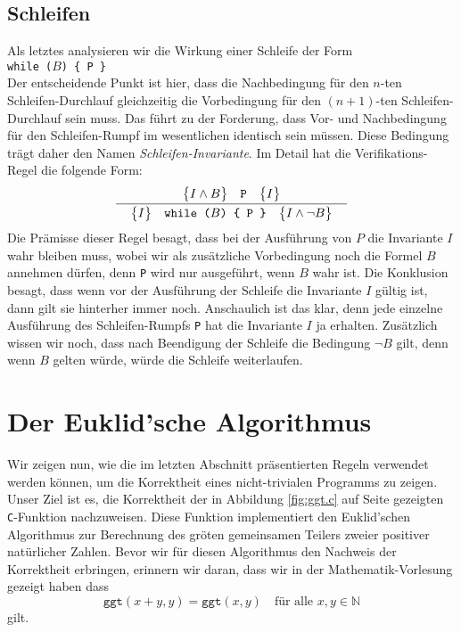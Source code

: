 \subsection{Schleifen}
Als letztes analysieren wir die Wirkung einer Schleife der Form 
\\[0.2cm]
\hspace*{1.3cm}
\texttt{while ($B$) \{ P \}} 
\\[0.2cm]
Der entscheidende Punkt ist hier, dass die Nachbedingung f\"ur den $n$-ten
Schleifen-Durchlauf gleichzeitig die Vorbedingung f\"ur den $(n\!+\!1)$-ten Schleifen-Durchlauf
sein muss.  Das f\"uhrt zu der Forderung, dass Vor- und Nachbedingung f\"ur den
Schleifen-Rumpf im wesentlichen identisch sein m\"ussen.  Diese Bedingung tr\"agt daher den
Namen \emph{Schleifen-Invariante}.  Im Detail hat die Verifikations-Regel die folgende Form:
\[ 
  \bruch{\hoare{I \wedge B}{P}{I}}{\quad \hoare{I}{while ($B$) \{ P \}}{I \wedge \neg B}\quad}
\]
Die Pr\"amisse dieser Regel besagt, dass bei der Ausf\"uhrung von $P$ die Invariante $I$
wahr bleiben muss, wobei wir als zus\"atzliche Vorbedingung noch die Formel $B$ annehmen
d\"urfen, denn \texttt{P} wird  nur ausgef\"uhrt, wenn $B$ wahr ist.
Die Konklusion besagt, dass wenn vor der Ausf\"uhrung der Schleife die Invariante $I$ g\"ultig
ist, dann gilt sie hinterher immer noch.  Anschaulich ist das klar, denn jede einzelne
Ausf\"uhrung des Schleifen-Rumpfs \texttt{P} hat die Invariante $I$ ja erhalten.
Zus\"atzlich wissen wir noch, dass nach Beendigung der Schleife die Bedingung $\neg B$ gilt,
denn wenn $B$ gelten w\"urde, w\"urde die Schleife weiterlaufen.


\section{Der Euklid'sche Algorithmus}
Wir zeigen nun, wie die im letzten Abschnitt pr\"asentierten Regeln verwendet werden k\"onnen,
um die Korrektheit eines nicht-trivialen Programms zu zeigen.  Unser Ziel ist es, die
Korrektheit der in Abbildung \ref{fig:ggt.c} auf Seite \pageref{fig:ggt.c} gezeigten
\texttt{C}-Funktion nachzuweisen.  Diese Funktion implementiert den Euklid'schen
Algorithmus zur Berechnung des gr\"o\3ten gemeinsamen Teilers zweier positiver nat\"urlicher
Zahlen.  Bevor wir f\"ur diesen Algorithmus den Nachweis der Korrektheit
erbringen, erinnern wir daran, dass wir in der Mathematik-Vorlesung gezeigt haben dass
\[ \texttt{ggt}(x + y, y) = \texttt{ggt}(x,y) \quad \mbox{f\"ur alle $x, y \in \mathbb{N}$} \]  
gilt.


